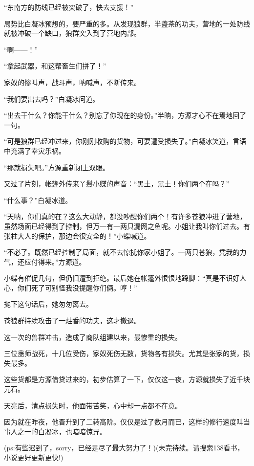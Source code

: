 \begin{this_body}
“东南方的防线已经被突破了，快去支援！”

局势比白凝冰预想的，要严重的多。从发现狼群，半盏茶的功夫，营地的一处防线就被冲破一个缺口，狼群突入到了营地内部。

“啊——！”

“拿起武器，和这帮畜生们拼了！”

家奴的惨叫声，战斗声，呐喊声，不断传来。

“我们要出去吗？”白凝冰问道。

“出去干什么？你能干什么？别忘了你现在的身份。”半晌，方源才心不在焉地回了一句。

“可是狼群已经冲过来，你刚刚收购的货物，可要遭受损失了。”白凝冰笑道，言语中充满了幸灾乐祸。

“那就损失吧。”方源重新闭上双眼。

又过了片刻，帐篷外传来丫鬟小蝶的声音：“黑土，黑土！你们两个在吗？”

“什么事？”白凝冰道。

“天呐，你们真的在？这么大动静，都没吵醒你们两个！有许多苍狼冲进了营地，虽然场面已经得到了控制，但万一有一两只漏网之鱼呢。小姐让我叫你们过去。有张柱大人的保护，那边会很安全的！”小蝶喊道。

“不必了。既然已经控制了局面，就不去惊扰你家小姐了。一两只苍狼，凭我的力气，还应付得来。”方源道。

小蝶有催促几句，但仍旧遭到拒绝。最后她在帐篷外恨恨地跺脚：“真是不识好人心，你们死了可别怪我没提醒你们俩。哼！”

抛下这句话后，她匆匆离去。

苍狼群持续攻击了一炷香的功夫，这才撤退。

这一次的兽群冲击，造成了商队组建以来，最惨重的损失。

三位蛊师战死，十几位受伤，家奴死伤无数，货物各有损失。尤其是张家的货，损失最多。

这些货都是方源借贷过来的，初步估算了一下，仅仅这一夜，方源就损失了近千块元石。

天亮后，清点损失时，他面带苦笑，心中却一点都不在意。

因为就在昨夜，他晋升到了二转高阶。仅仅是过了数月而已，这样的修行速度叫当事人之一的白凝冰，也暗暗惊异。

(ps:有些迟到了，sorry，已经是尽了最大努力了！)(未完待续。请搜索138看书，小说更好更新更快!)

\end{this_body}

